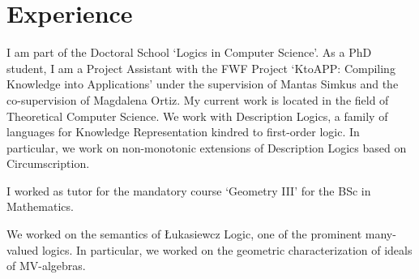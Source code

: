\documentclass[letterpaper]{deedy-resume} %
\begin{document}
%
\begin{minipage}[t]{0.66\textwidth} %


\section{Experience}


\vspace{\topsep} %
\begin{tightitemize}
\item I am part of the Doctoral School `Logics in Computer Science'. As a PhD student, I am a Project Assistant with the FWF Project `KtoAPP: Compiling Knowledge into Applications' under the supervision of Mantas Simkus and the co-supervision of Magdalena Ortiz. My current work is located in the field of Theoretical Computer Science. We work with Description Logics, a family of languages for Knowledge Representation kindred to first-order logic. In particular, we work on non-monotonic extensions of Description Logics based on Circumscription. 
\end{tightitemize}

\sectionspace %


\begin{tightitemize}
\item I worked as tutor for the mandatory course `Geometry III' for the BSc in Mathematics. 
\end{tightitemize}

\sectionspace


\begin{tightitemize}
\item We worked on the semantics of {\L}ukasiewcz Logic, one of the prominent many-valued logics. In particular, we worked on the geometric characterization of ideals of MV-algebras. 
\end{tightitemize}


\end{minipage}
\end{document}
